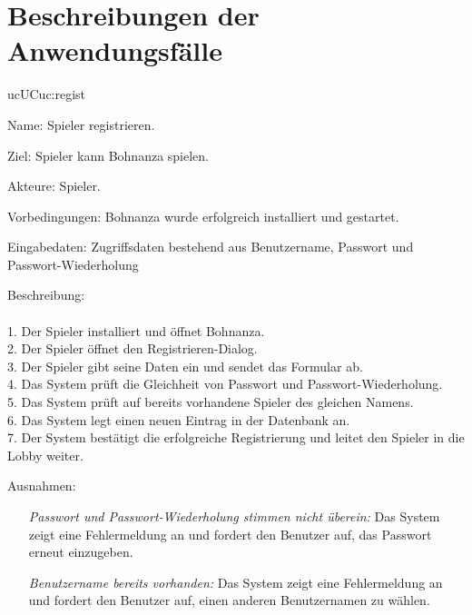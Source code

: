 \section{Beschreibungen der Anwendungsfälle}



\setcounter{uc}{10}

\begin{description}[leftmargin=5em, style=sameline]

	\begin{lhp}{uc}{UC}{uc:regist}
		\item [Name:] Spieler registrieren.
		\item [Ziel:] Spieler kann Bohnanza spielen. 
		\item [Akteure:] Spieler.
		\item [Vorbedingungen:] Bohnanza wurde erfolgreich installiert und gestartet.
		\item [Eingabedaten:] Zugriffsdaten bestehend aus Benutzername, Passwort und Passwort-Wiederholung
		\item [Beschreibung:] \hfill\\ \hfill\\
				1. Der Spieler installiert und öffnet Bohnanza.\\
				2. Der Spieler öffnet den Registrieren-Dialog. \\
				3. Der Spieler gibt seine Daten ein und sendet das Formular ab.\\
				4. Das System prüft die Gleichheit von Passwort und Passwort-Wiederholung.\\
				5. Das System prüft auf bereits vorhandene Spieler des gleichen Namens.\\
				6. Das System legt einen neuen Eintrag in der Datenbank an. \\
				7. Der System bestätigt die erfolgreiche Registrierung und leitet den Spieler in die Lobby weiter.\\
		\item [Ausnahmen:] \hfill
			\begin{itemize} 
				\item[] \textit{Passwort und Passwort-Wiederholung stimmen nicht überein:} Das System zeigt eine Fehlermeldung an und fordert den Benutzer auf, das Passwort erneut einzugeben.
				\item[] \textit{Benutzername bereits vorhanden:} Das System zeigt eine Fehlermeldung an und fordert den Benutzer auf, einen anderen Benutzernamen zu wählen.
			

\end{itemize}
\end{lhp}
\end{description}
